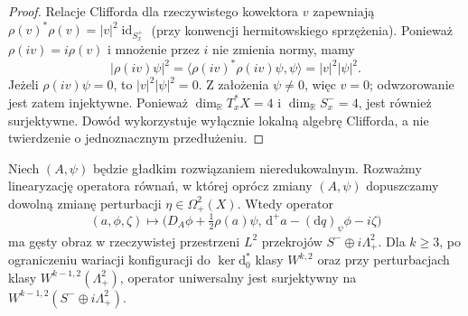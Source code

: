 \begin{proof}
Relacje Clifforda dla rzeczywistego
kowektora $v$ zapewniają
$\rho(v)^*\rho(v)=|v|^2\operatorname{id}_{S_x^+}$
(przy konwencji hermitowskiego sprzężenia).
Ponieważ $\rho(iv)=i\rho(v)$
i mnożenie przez $i$ nie zmienia normy,
mamy
\[
|\rho(iv)\psi|^2
=\langle\rho(iv)^*\rho(iv)\psi,\psi\rangle
=|v|^2|\psi|^2.
\]
Jeżeli $\rho(iv)\psi=0$, to
$|v|^2|\psi|^2=0$. Z założenia
$\psi\ne0$, więc $v=0$;
odwzorowanie jest zatem injektywne.
Ponieważ $\dim_{\mathbb R}T_x^*X=4$
i $\dim_{\mathbb R}S_x^-=4$,
jest również surjektywne.
Dowód wykorzystuje wyłącznie
lokalną algebrę Clifforda, a nie
twierdzenie o jednoznacznym przedłużeniu.
\end{proof}

\begin{lemat}
\label{lem:tg-sw12-surj}
Niech $(A,\psi)$ będzie gładkim rozwiązaniem nieredukowalnym.
Rozważmy linearyzację operatora równań, w której oprócz
zmiany $(A,\psi)$ dopuszczamy dowolną zmianę perturbacji
$\eta\in\Omega^2_+(X)$. Wtedy operator
\[
(a,\phi,\zeta)\longmapsto
\bigl(D_A\phi+\tfrac12\rho(a)\psi,\,
\mathrm d^+a-(\mathrm dq)_\psi\phi-i\zeta\bigr)
\]
ma gęsty obraz w rzeczywistej przestrzeni $L^2$
przekrojów $S^-\oplus i\Lambda^2_+$.
Dla $k\geq3$, po ograniczeniu wariacji konfiguracji
do $\ker\mathrm d_0^*$ klasy $W^{k,2}$ oraz przy
perturbacjach klasy $W^{k-1,2}(\Lambda^2_+)$,
operator uniwersalny jest surjektywny na
$W^{k-1,2}(S^-\oplus i\Lambda^2_+)$.
\end{lemat}

